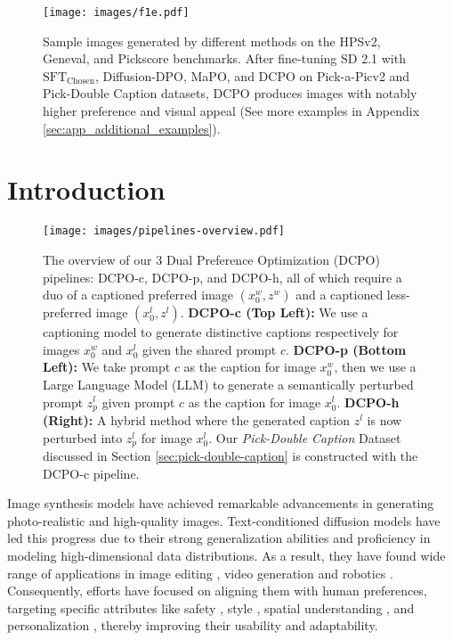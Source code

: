 \begin{figure}[!h]
    \centering
    \vspace{-1em}
    \texttt{[image: images/f1e.pdf]}
    \vspace{-.5em}
    \caption{Sample images generated by different methods on the HPSv2, Geneval, and Pickscore benchmarks. After fine-tuning SD 2.1 with \( \text{SFT}_{\text{Chosen}} \), Diffusion-DPO, MaPO, and DCPO on Pick-a-Picv2 and Pick-Double Caption datasets, DCPO produces images with notably higher preference and visual appeal (See more examples in Appendix \ref{sec:app_additional_examples}).}
    \label{fig:enter-label}
    \vspace{-1em}
\end{figure}

\section{Introduction}


\begin{figure}[!t]
    \centering
    
    \texttt{[image: images/pipelines-overview.pdf]}
    \caption{The overview of our 3 Dual Preference Optimization (DCPO) pipelines: DCPO-c, DCPO-p, and DCPO-h, all of which require a duo of a captioned preferred image $(x^w_0, z^w)$ and a captioned less-preferred image $(x^l_0, z^l)$.  \textbf{DCPO-c (Top Left):} We use a captioning model to generate distinctive captions respectively for images  $x^w_0$ and $x^l_0$ given the shared prompt $c$. \textbf{DCPO-p (Bottom Left):} We take prompt $c$ as the caption for image $x^w_0$, then we use a Large Language Model (LLM) to generate a semantically perturbed prompt $z_p^l$ given prompt $c$ as the caption for image $x^l_0$. \textbf{DCPO-h (Right): } A hybrid method where the generated caption $z^l$ is now perturbed into $z_p^l$ for image $x^l_0$. Our \textit{Pick-Double Caption} Dataset discussed in Section \ref{sec:pick-double-caption} is constructed with the DCPO-c pipeline.}
    \label{fig:overview}
\end{figure}


Image synthesis models \citep{rombach2022high, esser2024scaling} have achieved remarkable advancements in generating photo-realistic and high-quality images. Text-conditioned diffusion \citep{song2020denoising} models have led this progress due to their strong generalization abilities and proficiency in modeling high-dimensional data distributions. As a result, they have found wide range of applications in image editing \citep{brooks2023instructpix2pix}, video generation \citep{wu2023tune} and robotics \citep{carvalho2023motion}. Consequently, efforts have focused on aligning them with human preferences, targeting specific attributes like safety \citep{liu2024latent}, style \citep{patel2024steering, Everaert_2023_ICCV}, spatial understanding \citep{chatterjee2024getting}, and personalization \citep{ruiz2023dreambooth}, thereby improving their usability and adaptability.

